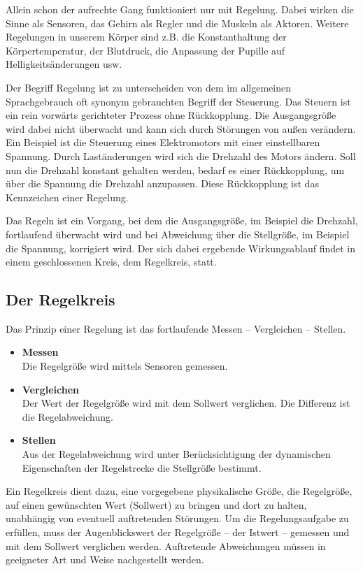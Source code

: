 Allein schon der aufrechte Gang funktioniert nur mit Regelung. Dabei wirken die Sinne als Sensoren, das Gehirn als Regler und die Muskeln als Aktoren. Weitere Regelungen in unserem Körper sind z.B. die Konstanthaltung der Körpertemperatur, der Blutdruck, die Anpassung der Pupille auf Helligkeitsänderungen usw.

Der Begriff Regelung ist zu unterscheiden von dem im allgemeinen Sprachgebrauch oft synonym gebrauchten Begriff der Steuerung. Das Steuern ist ein rein vorwärts gerichteter Prozess ohne Rückkopplung. Die Ausgangsgröße wird dabei nicht überwacht und kann sich durch Störungen von außen verändern. Ein Beispiel ist die Steuerung eines Elektromotors mit einer einstellbaren Spannung. Durch Laständerungen wird sich die Drehzahl des Motors ändern. Soll nun die Drehzahl konstant gehalten werden, bedarf es einer Rückkopplung, um über die Spannung die Drehzahl anzupassen. Diese Rückkopplung ist das Kennzeichen einer Regelung.

Das Regeln ist ein Vorgang, bei dem die Ausgangsgröße, im Beispiel die Drehzahl, fortlaufend überwacht wird und bei Abweichung über die Stellgröße, im Beispiel die Spannung, korrigiert wird. Der sich dabei ergebende Wirkungsablauf findet in einem geschlossenen Kreis, dem Regelkreis, statt.
\vspace{5mm}

\subsection{Der Regelkreis}
Das Prinzip einer Regelung ist das fortlaufende Messen – Vergleichen – Stellen.
\\[5mm]

\begin{itemize}
	\item \textbf{Messen}
	\\[1mm] Die Regelgröße wird mittels Sensoren gemessen.
	\medskip
	\item \textbf{Vergleichen}
	\\[1mm] Der Wert der Regelgröße wird mit dem Sollwert verglichen. Die Differenz ist die Regelabweichung.
	\medskip
	\item \textbf{Stellen}
	\\[1mm] Aus der Regelabweichung wird unter Berücksichtigung der dynamischen Eigenschaften der Regelstrecke die Stellgröße bestimmt.
\end{itemize}
\vspace{3mm}

Ein Regelkreis dient dazu, eine vorgegebene physikalische Größe, die Regelgröße, auf einen gewünschten Wert (Sollwert) zu bringen und dort zu halten, unabhängig von eventuell auftretenden Störungen. Um die Regelungsaufgabe zu erfüllen, muss der Augenblickswert der Regelgröße – der Istwert – gemessen und mit dem Sollwert verglichen werden. Auftretende Abweichungen müssen in geeigneter Art und Weise nachgestellt werden.

